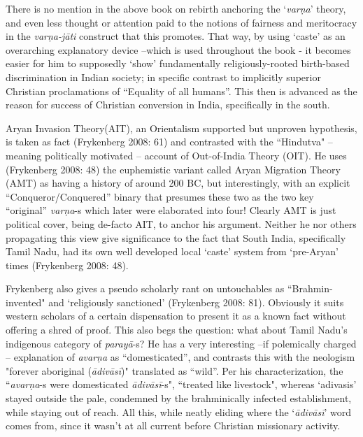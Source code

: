 There is no mention in the above book on rebirth anchoring the ‘\textit{varṇa}’ theory, and even less thought or attention paid to the notions of fairness and meritocracy in the \textit{varṇa-jāti} construct that this promotes. That way, by using ‘caste’ as an overarching explanatory device –which is used throughout the book - it becomes easier for him to supposedly ‘show’ fundamentally religiously-rooted birth-based discrimination in Indian society; in specific contrast to implicitly superior Christian proclamations of “Equality of all humans”. This then is advanced as the reason for success of Christian conversion in India, specifically in the south.

Aryan Invasion Theory(AIT), an Orientalism supported but unproven hypothesis, is taken as fact (Frykenberg 2008: 61) and contrasted with the “Hindutva" – meaning politically motivated – account of Out-of-India Theory (OIT). He uses (Frykenberg 2008: 48) the euphemistic variant called Aryan Migration Theory (AMT) as having a history of around 200 BC, but interestingly, with an explicit “Conqueror/Conquered” binary that presumes these two as the two key “original” \textit{varṇa}-s which later were elaborated into four! Clearly AMT is just political cover, being de-facto AIT, to anchor his argument. Neither he nor others propagating this view give significance to the fact that South India, specifically Tamil Nadu, had its own well developed local ‘caste’ system from ‘pre-Aryan’ times (Frykenberg 2008: 48).

Frykenberg also gives a pseudo scholarly rant on untouchables as “Brahmin-invented" and ‘religiously sanctioned’ (Frykenberg 2008: 81). Obviously it suits western scholars of a certain dispensation to present it as a known fact without offering a shred of proof. This also begs the question: what about Tamil Nadu’s indigenous category of \textit{parayā}-s? He has a very interesting –if polemically charged – explanation of \textit{avarṇa} as “domesticated”, and contrasts this with the neologism "forever aboriginal (\textit{ādivāsī})" translated as “wild”. Per his characterization, the “\textit{avarṇa}-s were domesticated \textit{ādivāsī}-s", “treated like livestock", whereas ‘adivasis' stayed outside the pale, condemned by the brahminically infected establishment, while staying out of reach. All this, while neatly eliding where the ‘\textit{ādivāsī}’ word comes from, since it wasn’t at all current before Christian missionary activity.

